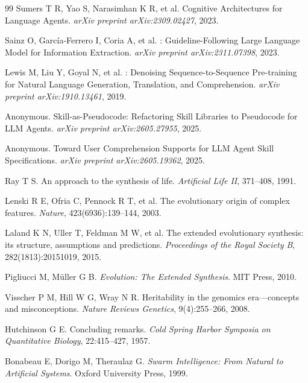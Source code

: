 \documentclass[12pt,a4paper]{ctexart}
\begin{document}
\begin{thebibliography}{99}
Sumers T R, Yao S, Narasimhan K R, et al.
\newblock Cognitive Architectures for Language Agents.
\newblock \emph{arXiv preprint arXiv:2309.02427}, 2023.

Sainz O, Garc{\'i}a-Ferrero I, Coria A, et al.
: Guideline-Following Large Language Model for Information Extraction.
\newblock \emph{arXiv preprint arXiv:2311.07398}, 2023.

Lewis M, Liu Y, Goyal N, et al.
: Denoising Sequence-to-Sequence Pre-training for Natural Language Generation, Translation, and Comprehension.
\newblock \emph{arXiv preprint arXiv:1910.13461}, 2019.

Anonymous.
\newblock Skill-as-Pseudocode: Refactoring Skill Libraries to Pseudocode for {LLM} Agents.
\newblock \emph{arXiv preprint arXiv:2605.27955}, 2025.

Anonymous.
\newblock Toward User Comprehension Supports for {LLM} Agent Skill Specifications.
\newblock \emph{arXiv preprint arXiv:2605.19362}, 2025.

Ray T S.
\newblock An approach to the synthesis of life.
\newblock \emph{Artificial Life II}, 371--408, 1991.

Lenski R E, Ofria C, Pennock R T, et al.
\newblock The evolutionary origin of complex features.
\newblock \emph{Nature}, 423(6936):139--144, 2003.

Laland K N, Uller T, Feldman M W, et al.
\newblock The extended evolutionary synthesis: its structure, assumptions and predictions.
\newblock \emph{Proceedings of the Royal Society B}, 282(1813):20151019, 2015.

Pigliucci M, M{\"u}ller G B.
\newblock \emph{Evolution: The Extended Synthesis}.
\newblock MIT Press, 2010.

Visscher P M, Hill W G, Wray N R.
\newblock Heritability in the genomics era---concepts and misconceptions.
\newblock \emph{Nature Reviews Genetics}, 9(4):255--266, 2008.

Hutchinson G E.
\newblock Concluding remarks.
\newblock \emph{Cold Spring Harbor Symposia on Quantitative Biology}, 22:415--427, 1957.

Bonabeau E, Dorigo M, Theraulaz G.
\newblock \emph{Swarm Intelligence: From Natural to Artificial Systems}.
\newblock Oxford University Press, 1999.


\end{thebibliography}
\end{document}
